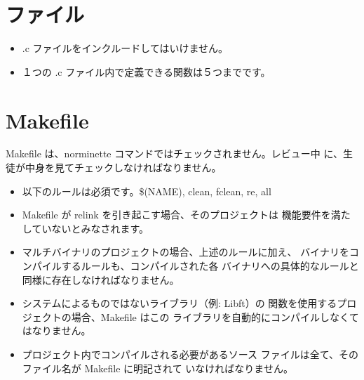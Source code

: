 \documentclass{42-ja}
\begin{document}
    \section{ファイル}

        \begin{itemize}

            \item .c ファイルをインクルードしてはいけません。

            \item １つの .c ファイル内で定義できる関数は５つまでです。

        \end{itemize}
        \newpage


    \section{Makefile}

            Makefile は、norminette コマンドではチェックされません。レビュー中
			に、生徒が中身を見てチェックしなければなりません。
            \begin{itemize}

                \item 以下のルールは必須です。\$(NAME), clean, fclean, re, all

                \item Makefile が relink を引き起こす場合、そのプロジェクトは
					機能要件を満たしていないとみなされます。

                \item マルチバイナリのプロジェクトの場合、上述のルールに加え、
					バイナリをコンパイルするルールも、コンパイルされた各
					バイナリへの具体的なルールと同様に存在しなければなりません。

                  \item システムによるものではないライブラリ（例: Libft）の
					  関数を使用するプロジェクトの場合、Makefile はこの
					  ライブラリを自動的にコンパイルしなくてはなりません。

                  \item プロジェクト内でコンパイルされる必要があるソース
					  ファイルは全て、そのファイル名が Makefile に明記されて
					  いなければなりません。

            \end{itemize}
\end{document}
